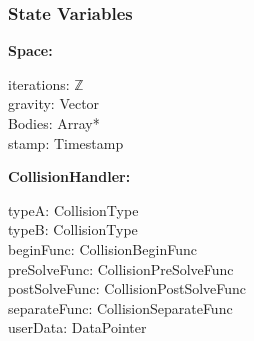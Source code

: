 \documentclass[12pt]{article}
\newcommand{\B}{$\mathbb{B}$}
\newcommand{\R}{$\mathbb{R}$}
\newcommand{\Z}{$\mathbb{Z}$}
\newcommand{\UZ}{$\mathbb{Z}^+$}
\begin{document}
\subsubsection{State Variables} \label{SecSVSpace}
	\textbf{Space:} 
	\begin{multicols}{2}
		\noindent iterations: \Z \\
		gravity: Vector \\
		Bodies: Array* \\
		stamp: Timestamp \\
	\end{multicols}

	
	\noindent \textbf{CollisionHandler:}
	\begin{multicols}{3}
		\noindent typeA: CollisionType \\
		typeB: CollisionType \\
		beginFunc: CollisionBeginFunc \\
		preSolveFunc: CollisionPreSolveFunc \\
		postSolveFunc: CollisionPostSolveFunc \\
		separateFunc: CollisionSeparateFunc \\
		userData: DataPointer
	\end{multicols}
	
\end{document}
